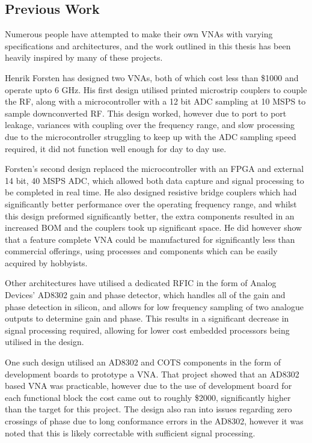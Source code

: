 \subsection{Previous Work}
Numerous people have attempted to make their own VNAs with varying specifications and architectures, and the work outlined in this thesis has been heavily inspired by many of these projects. 

Henrik Forsten has designed two VNAs, both of which cost less than \$1000 and operate upto 6 GHz. His first design \cite{henrik_1} utilised printed microstrip couplers to couple the RF, along with a microcontroller with a 12 bit ADC sampling at 10 MSPS to sample downconverted RF. This design worked, however due to port to port leakage, variances with coupling over the frequency range, and slow processing due to the microcontroller struggling to keep up with the ADC sampling speed required, it did not function well enough for day to day use.  

Forsten's second design \cite{henrik_2} replaced the microcontroller with an FPGA and external 14 bit, 40 MSPS ADC, which allowed both data capture and signal processing to be completed in real time. He also designed resistive bridge couplers which had significantly better performance over the operating frequency range, and whilst this design preformed significantly better, the extra components resulted in an increased BOM and the couplers took up significant space. He did however show that a feature complete VNA could be manufactured for significantly less than commercial offerings, using processes and components which can be easily acquired by hobbyists.  

Other architectures have utilised a dedicated RFIC in the form of Analog Devices' AD8302 gain and phase detector, which handles all of the gain and phase detection in silicon, and allows for low frequency sampling of two analogue outputs to determine gain and phase. This results in a significant decrease in signal processing required, allowing for lower cost embedded processors being utilised in the design. 

One such design \cite{nagy_vna} utilised an AD8302 and COTS components in the form of development boards to prototype a VNA. That project showed that an AD8302 based VNA was practicable, however due to the use of development board for each functional block the cost came out to roughly \$2000, significantly higher than the target for this project. The design also ran into issues regarding zero crossings of phase due to long conformance errors in the AD8302, however it was noted that this is likely correctable with sufficient signal processing.  

